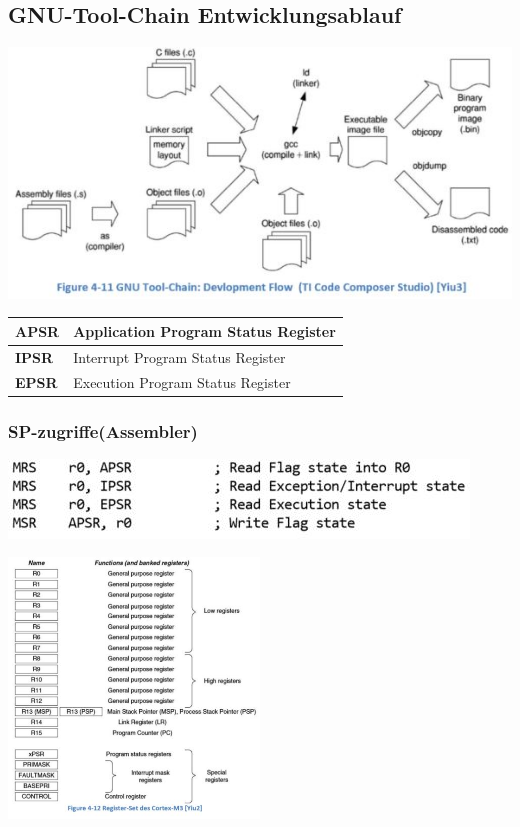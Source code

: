 \subsection{GNU-Tool-Chain Entwicklungsablauf}
\begin{multicols}{2}
          \begin{minipage}{\linewidth}
    \includegraphics[width=\textwidth]{images/gnutoolchain}
    \begin{tabular}{|l|l|}
        \hline 
        \textbf{APSR}& Application Program Status Register \\ 
        \hline 
        \textbf{IPSR}& Interrupt Program Status Register \\ 
        \hline 
        \textbf{EPSR}& Execution Program Status Register \\ 
        \hline 
    \end{tabular}
    \subsubsection{SP-zugriffe(Assembler)}
      \includegraphics[width=\textwidth]{images/SPzugriffe}   
\end{minipage}
    
    \includegraphics[width=0.5\textwidth]{images/gnutoolchain1}
\end{multicols}

